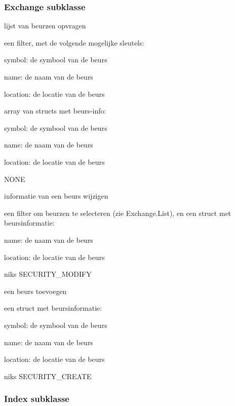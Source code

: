 \subsubsection{Exchange subklasse}

	{ lijst van beurzen opvragen }
	{ een filter, met de volgende mogelijke sleutels:
		\begin{itemize_compact}
		\item{symbol: de symbool van de beurs}
		\item{name: de naam van de beurs}
		\item{location: de locatie van de beurs}
		\end{itemize_compact} }
	{ array van structs met beurs-info:
		\begin{itemize_compact}
		\item{symbol: de symbool van de beurs}
		\item{name: de naam van de beurs}
		\item{location: de locatie van de beurs}
		\end{itemize_compact} }
	{ NONE }

	{ informatie van een beurs wijzigen }
	{ een filter om beurzen te selecteren (zie Exchange.List), en een struct met beursinformatie:
		\begin{itemize_compact}
		\item{name: de naam van de beurs}
		\item{location: de locatie van de beurs}
		\end{itemize_compact} }
	{ niks }
	{ SECURITY\_MODIFY }

	{ een beurs toevoegen }
	{ een struct met beursinformatie:
		\begin{itemize_compact}
		\item{symbol: de symbool van de beurs}
		\item{name: de naam van de beurs}
		\item{location: de locatie van de beurs}
		\end{itemize_compact} }
	{ niks }
	{ SECURITY\_CREATE }


\subsubsection{Index subklasse}

